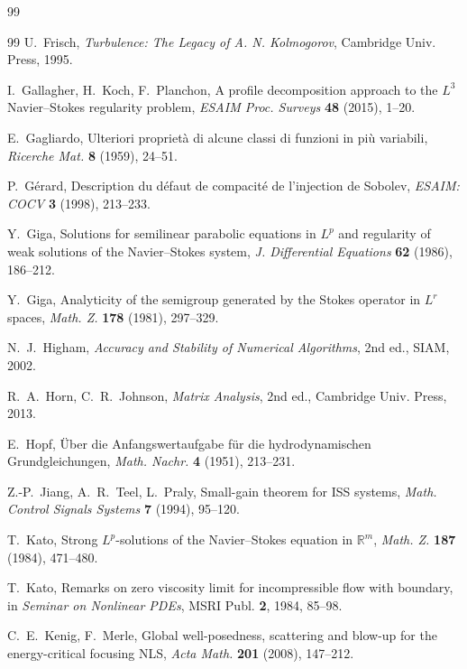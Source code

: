\IfFileExists{nyjm.cls}{\documentclass[11pt]{nyjm}}{\documentclass[11pt]{amsart}}
\newcommand{\R}{\mathbb{R}}
\theoremstyle{plain}
\theoremstyle{definition}
\theoremstyle{remark}
\begin{document}
\begin{thebibliography}{99}
\begin{thebibliography}{99}
U.~Frisch,
\emph{Turbulence: The Legacy of A. N. Kolmogorov},
Cambridge Univ. Press, 1995.

I.~Gallagher, H.~Koch, F.~Planchon,
A profile decomposition approach to the $L^3$ Navier--Stokes regularity problem,
\emph{ESAIM Proc. Surveys} \textbf{48} (2015), 1--20.

E.~Gagliardo,
Ulteriori propriet\`a di alcune classi di funzioni in pi\`u variabili,
\emph{Ricerche Mat.} \textbf{8} (1959), 24--51.

P.~G\'erard,
Description du d\'efaut de compacit\'e de l’injection de Sobolev,
\emph{ESAIM: COCV} \textbf{3} (1998), 213--233.

Y.~Giga,
Solutions for semilinear parabolic equations in $L^p$ and regularity of weak solutions of the Navier--Stokes system,
\emph{J. Differential Equations} \textbf{62} (1986), 186--212.

Y.~Giga,
Analyticity of the semigroup generated by the Stokes operator in $L^r$ spaces,
\emph{Math. Z.} \textbf{178} (1981), 297--329.

N.~J.~Higham,
\emph{Accuracy and Stability of Numerical Algorithms}, 2nd ed.,
SIAM, 2002.

R.~A.~Horn, C.~R.~Johnson,
\emph{Matrix Analysis}, 2nd ed.,
Cambridge Univ. Press, 2013.

E.~Hopf,
\"Uber die Anfangswertaufgabe f\"ur die hydrodynamischen Grundgleichungen,
\emph{Math. Nachr.} \textbf{4} (1951), 213--231.

Z.-P.~Jiang, A.~R.~Teel, L.~Praly,
Small-gain theorem for ISS systems,
\emph{Math. Control Signals Systems} \textbf{7} (1994), 95--120.

T.~Kato,
Strong $L^p$-solutions of the Navier--Stokes equation in $\R^m$,
\emph{Math. Z.} \textbf{187} (1984), 471--480.

T.~Kato,
Remarks on zero viscosity limit for incompressible flow with boundary,
in \emph{Seminar on Nonlinear PDEs}, MSRI Publ. \textbf{2}, 1984, 85--98.

C.~E.~Kenig, F.~Merle,
Global well-posedness, scattering and blow-up for the energy-critical focusing NLS,
\emph{Acta Math.} \textbf{201} (2008), 147--212.


\end{thebibliography}
\end{thebibliography}
\end{document}
